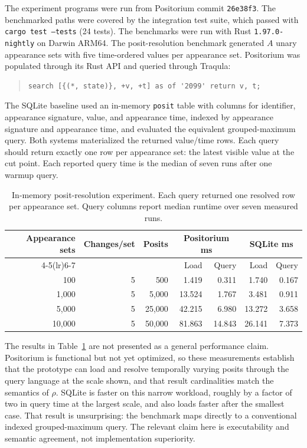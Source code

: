 \documentclass[a4paper,fleqn]{cas-sc}
\theoremstyle{plain}
\theoremstyle{remark}
\begin{document}
The experiment programs were run from Positorium commit \texttt{26e38f3}. The benchmarked paths were covered by the integration test suite, which passed with \texttt{cargo test --tests} (24 tests). The benchmarks were run with Rust \texttt{1.97.0-nightly} on Darwin ARM64. The posit-resolution benchmark generated \(A\) unary appearance sets with five time-ordered values per appearance set. Positorium was populated through its Rust API and queried through Traqula:
\begin{quote}
\small
\begin{verbatim}
search [{(*, state)}, +v, +t] as of '2099' return v, t;
\end{verbatim}
\end{quote}
The SQLite baseline used an in-memory \texttt{posit} table with columns for identifier, appearance signature, value, and appearance time, indexed by appearance signature and appearance time, and evaluated the equivalent grouped-maximum query. Both systems materialized the returned value/time rows. Each query should return exactly one row per appearance set: the latest visible value at the cut point. Each reported query time is the median of seven runs after one warmup query.

\begin{table}[t]
\centering
\small
\begin{tabular}{r r r r r r r}
\toprule
Appearance sets & Changes/set & Posits & \multicolumn{2}{c}{Positorium ms} & \multicolumn{2}{c}{SQLite ms} \\
\cmidrule(lr){4-5}\cmidrule(lr){6-7}
 & & & Load & Query & Load & Query \\
\midrule
100 & 5 & 500 & 1.419 & 0.311 & 1.740 & 0.167 \\
1,000 & 5 & 5,000 & 13.524 & 1.767 & 3.481 & 0.911 \\
5,000 & 5 & 25,000 & 42.215 & 6.980 & 13.272 & 3.658 \\
10,000 & 5 & 50,000 & 81.863 & 14.843 & 26.141 & 7.373 \\
\bottomrule
\end{tabular}
\caption{In-memory posit-resolution experiment. Each query returned one resolved row per appearance set. Query columns report median runtime over seven measured runs.}
\label{Table:prototype}
\end{table}

The results in Table~\ref{Table:prototype} are not presented as a general performance claim. Positorium is functional but not yet optimized, so these measurements establish that the prototype can load and resolve temporally varying posits through the query language at the scale shown, and that result cardinalities match the semantics of \(\rho\). SQLite is faster on this narrow workload, roughly by a factor of two in query time at the largest scale, and also loads faster after the smallest case. That result is unsurprising: the benchmark maps directly to a conventional indexed grouped-maximum query. The relevant claim here is executability and semantic agreement, not implementation superiority.
\end{document}
